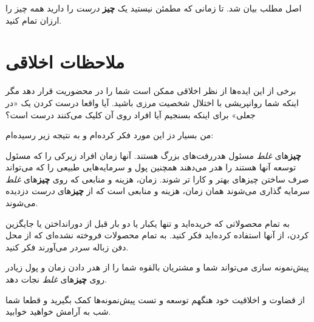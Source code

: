 اصل مطلب بیان شد. تا زمانی که مطمئن نیستید یک \textbf{چیز} \emph{درست}
را دارید همه چیز را ارزان تمام کنید.

\section{ملاحظات
اخلاقی}\label{ux645ux644ux627ux62dux638ux627ux62a-ux627ux62eux644ux627ux642ux6cc}

برخی از این ایده‌ها از نظر اخلاقی ممکن است شما را در محضوریت قرار دهد
مگر اینکه شما روانپریشی با اختلال شخصیت مرزی باشید. آیا واقعا درست کردن
یک «در جعلی» برای اینکه بسنجیم آیا افراد روی آن کلیک می‌کنند درست است؟

من بسیار دز این مورد فکر کرده‌ام و به نتیجه زیر رسیده‌ام:

\textbf{چیز}های \emph{غلط} مسئول هدررفت‌های بزرگ هستند. آنها زمان افراد
زیرکی را که مسئول توسعه آنها هستند را هدر می‌دهند همچنین پول و
سرمایه‌هایی طبیعی را که می‌تواند صرف ساختن چیزهای بهتر و کارا تر شوند.
زمان، هزینه و منابعی که روی \textbf{چیز}های \emph{غلط} سرمایه گذاری
می‌شوند همان زمان، هزینه و منابعی است که از \textbf{چیز}های \emph{درست}
دزدیده می‌شوند.

به تمام محصولاتی که خریده‌اید و تنها یکبار یا دو بار قبل از دورانداختن
یا جایگزین کردن، از آنها استفاده کرده‌اید فکر کنید. به تمام محصولات
فروخته نشده‌ای که از محل دفن زباله سردر می‌آورند فکر کنید.

پیش‌نمونه سازی می‌تواند شما و مشتریان بالقوه شما را از هدر دادن زمان و
پول زیادر روی \textbf{چیز}های \emph{غلط} نجات دهد.

از قضاوت و اخلاقیت خود هنگهم توسعه و تست پیش‌نمونه‌ها کمک بگیرید و قطعا
شما شب به آرامش خواهید خوابید.

